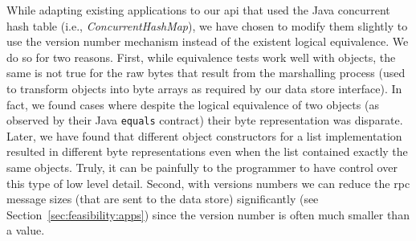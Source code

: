 While adapting existing applications to our \gls{api} that used the Java concurrent hash table (i.e., \emph{ConcurrentHashMap}), we have chosen to modify them slightly to use the version number mechanism instead of the existent logical equivalence. We do so for two reasons. First, while equivalence tests work well with objects, the same is not true for the raw bytes that result from the marshalling process (used to transform objects into byte arrays as required by our data store interface). In fact, we found cases where despite the  logical equivalence of two objects (as observed by their Java \texttt{equals} contract) their byte representation was disparate. Later, we have found that different object constructors for a list implementation resulted in different byte representations even when the list contained exactly the same objects. Truly, it can be painfully to the programmer to have control over this type of low level detail. Second, with versions numbers we can  reduce the \gls{rpc} message sizes (that are sent to the data store) significantly (see Section~\ref{sec:feasibility:apps}) since the version number is often much smaller than a value. 


